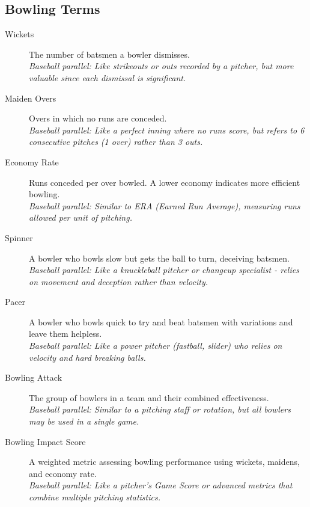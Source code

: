 \documentclass{article}[12pt]
\begin{document}
\subsection*{Bowling Terms}
\begin{description}
    \item[Wickets] The number of batsmen a bowler dismisses.\\
    \textit{Baseball parallel: Like strikeouts or outs recorded by a pitcher, but more valuable since each dismissal is significant.}

    \item[Maiden Overs] Overs in which no runs are conceded.\\
    \textit{Baseball parallel: Like a perfect inning where no runs score, but refers to 6 consecutive pitches (1 over) rather than 3 outs.}

    \item[Economy Rate] Runs conceded per over bowled. A lower economy indicates more efficient bowling.\\
    \textit{Baseball parallel: Similar to ERA (Earned Run Average), measuring runs allowed per unit of pitching.}

    \item[Spinner] A bowler who bowls slow but gets the ball to turn, deceiving batsmen.\\
    \textit{Baseball parallel: Like a knuckleball pitcher or changeup specialist - relies on movement and deception rather than velocity.}

    \item[Pacer] A bowler who bowls quick to try and beat batsmen with variations and leave them helpless.\\
    \textit{Baseball parallel: Like a power pitcher (fastball, slider) who relies on velocity and hard breaking balls.}

    \item[Bowling Attack] The group of bowlers in a team and their combined effectiveness.\\
    \textit{Baseball parallel: Similar to a pitching staff or rotation, but all bowlers may be used in a single game.}

    \item[Bowling Impact Score] A weighted metric assessing bowling performance using wickets, maidens, and economy rate.\\
    \textit{Baseball parallel: Like a pitcher's Game Score or advanced metrics that combine multiple pitching statistics.}
\end{description}
\end{document}
